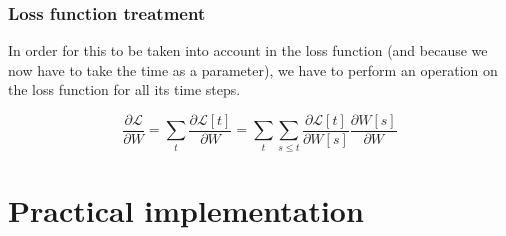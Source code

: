 \documentclass[11pt]{article}
\begin{document}
\subsubsection{Loss function treatment}

In order for this to be taken into account in the loss function (and because we now have to take the time as a parameter), we have to perform an operation on the loss function for all its time steps.

$$ \frac{\partial \mathcal{L}}{\partial W}=\sum_t \frac{\partial\mathcal{L}[t]}{\partial W} =
  \sum_t \sum_{s\leq t} \frac{\partial\mathcal{L}[t]}{\partial W[s]}\frac{\partial W[s]}{\partial W}$$

\section{Practical implementation}

\pagebreak



\end{document}
